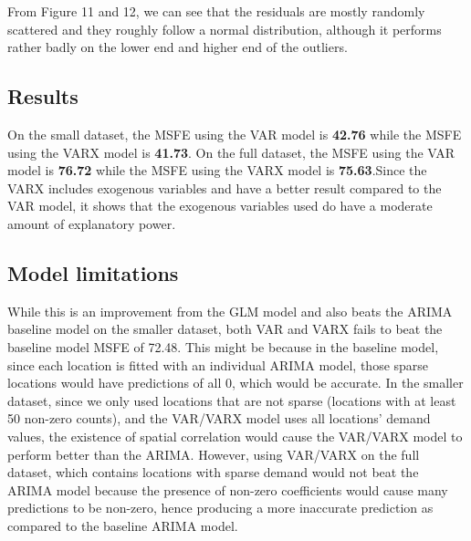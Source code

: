 \documentclass[12pt, letterpaper] {article}
\begin{document}
From Figure 11 and 12, we can see that the residuals are mostly randomly scattered and they roughly follow a normal distribution, although it performs rather badly on the lower end and higher end of the outliers. 


%
%
%

\subsection{Results}
On the small dataset, the MSFE using the VAR model is \textbf{42.76} while the MSFE using the VARX model is \textbf{41.73}. On the full dataset, the MSFE using the VAR model  is \textbf{76.72} while the MSFE using the VARX model is \textbf{75.63}.Since the VARX includes exogenous variables and have a better result compared to the VAR model, it shows that the exogenous variables used do have a moderate amount of explanatory power. 

\subsection{Model limitations}

While this is an improvement from the GLM model and also beats the ARIMA baseline model on the smaller dataset, both VAR and VARX fails to beat the baseline model MSFE of 72.48. This might be because in the baseline model, since each location is fitted with an individual ARIMA model, those sparse locations would have predictions of all 0, which would be accurate. In the smaller dataset, since we only used locations that are not sparse (locations with at least 50 non-zero counts), and the VAR/VARX model uses all locations' demand values, the existence of spatial correlation would cause the VAR/VARX model to perform better than the ARIMA. However, using VAR/VARX on the full dataset, which contains locations with sparse demand would not beat the ARIMA model because the presence of non-zero coefficients would cause many predictions to be non-zero, hence producing a more inaccurate prediction as compared to the baseline ARIMA model. 
\end{document}
